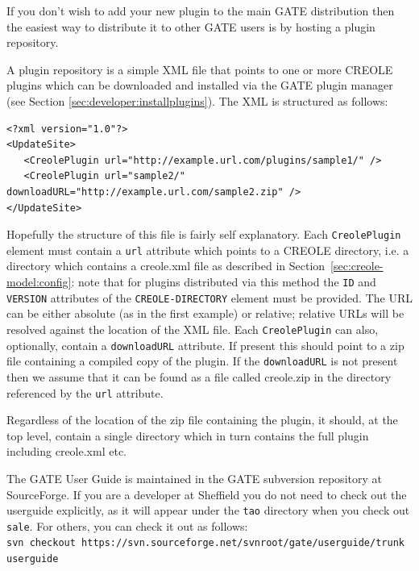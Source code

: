 If you don't wish to add your new plugin to the main GATE distribution then
the easiest way to distribute it to other GATE users is by hosting a plugin
repository.

A plugin repository is a simple XML file that points to one or more CREOLE
plugins which can be downloaded and installed via the GATE plugin manager
(see Section \ref{sec:developer:installplugins}). The XML is structured
as follows:

\begin{small}\begin{verbatim}
<?xml version="1.0"?>
<UpdateSite>
   <CreolePlugin url="http://example.url.com/plugins/sample1/" />
   <CreolePlugin url="sample2/" downloadURL="http://example.url.com/sample2.zip" />
</UpdateSite>
\end{verbatim}\end{small}

Hopefully the structure of this file is fairly self explanatory. Each {\tt CreolePlugin}
element must contain a {\tt url} attribute which points to a CREOLE directory, i.e. a
directory which contains a creole.xml file as described in
Section~\ref{sec:creole-model:config}: note that for plugins distributed via
this method the {\tt ID} and {\tt VERSION} attributes of the {\tt CREOLE-DIRECTORY}
element must be provided. The URL can be either absolute (as in the first
example) or relative; relative URLs will be resolved against the location of the XML file.
Each {\tt CreolePlugin} can also, optionally, contain a {\tt downloadURL} attribute. If present
this should point to a zip file containing  a compiled copy of the plugin. If the {\tt downloadURL}
is not present then we assume that it can be found as a file called creole.zip in the
directory referenced by the {\tt url} attribute.

Regardless of the location of the zip file containing the plugin, it should,
at the top level, contain a single directory which in turn contains the full plugin
including creole.xml etc.


The GATE User Guide is maintained in the GATE subversion repository at
SourceForge.  If you are a developer at Sheffield you do not need to check out
the userguide explicitly, as it will appear under the \texttt{tao} directory
when you check out \texttt{sale}.  For others, you can check it out as follows:
\\
{\small\tt svn checkout https://svn.sourceforge.net/svnroot/gate/userguide/trunk userguide}

